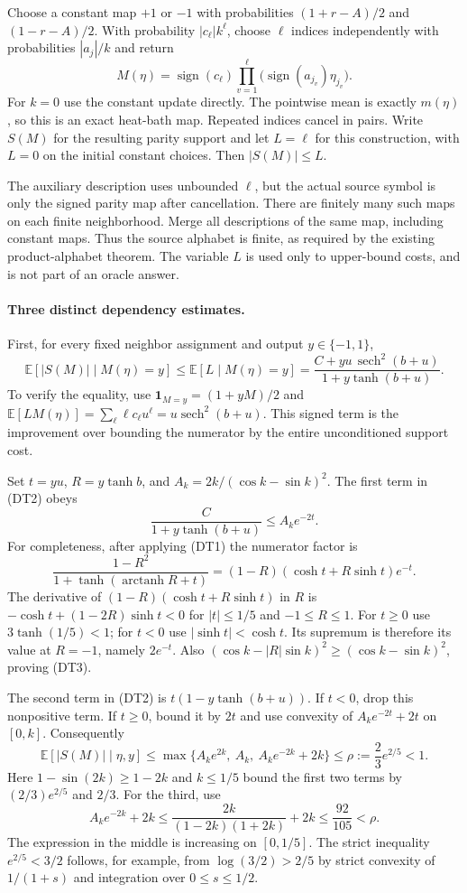 Choose a constant map $+1$ or $-1$ with probabilities
$(1+r-A)/2$ and $(1-r-A)/2$. With probability
$|c_\ell|k^\ell$, choose $\ell$ indices independently with
probabilities $|a_j|/k$ and return
\[
 M(\eta)=\operatorname{sign}(c_\ell)
             \prod_{v=1}^\ell\bigl(\operatorname{sign}(a_{j_v})\eta_{j_v}\bigr).
\]
For $k=0$ use the constant update directly. The pointwise mean is
exactly $m(\eta)$, so this is an exact heat-bath map. Repeated indices
cancel in pairs. Write $S(M)$ for the resulting parity support and
let $L=\ell$ for this construction, with $L=0$ on the initial constant
choices. Then $|S(M)|\le L$.

The auxiliary description uses unbounded $\ell$, but the actual
source symbol is only the signed parity map after cancellation.
There are finitely many such maps on each finite neighborhood.
Merge all descriptions of the same map, including constant maps.
Thus the source alphabet is finite, as required by the existing
product-alphabet theorem. The variable $L$ is used only to upper-bound
costs, and is not part of an oracle answer.

\paragraph{Three distinct dependency estimates.}
First, for every fixed neighbor assignment and output $y\in\{-1,1\}$,
\[
 \mathbb E[|S(M)|\mid M(\eta)=y]
 \le \mathbb E[L\mid M(\eta)=y]
 =\frac{C+y u\,\operatorname{sech}^2(b+u)}{1+y\tanh(b+u)}.
                                                               \tag{DT2}
\]
To verify the equality, use
$\mathbf1_{M=y}=(1+yM)/2$ and
$\mathbb E[LM(\eta)]=\sum_\ell\ell c_\ell u^\ell
=u\operatorname{sech}^2(b+u)$.
This signed term is the improvement over bounding the numerator
by the entire unconditioned support cost.

Set $t=yu$, $R=y\tanh b$, and
$A_k=2k/(\cos k-\sin k)^2$. The first term in (DT2) obeys
\[
 \frac{C}{1+y\tanh(b+u)}\le A_k e^{-2t}.              \tag{DT3}
\]
For completeness, after applying (DT1) the numerator factor is
\[
 \frac{1-R^2}{1+\tanh(\operatorname{arctanh}R+t)}
 =(1-R)(\cosh t+R\sinh t)e^{-t}.
\]
The derivative of $(1-R)(\cosh t+R\sinh t)$ in $R$ is
$-\cosh t+(1-2R)\sinh t<0$ for $|t|\le1/5$ and $-1\le R\le1$.
For $t\ge0$ use $3\tanh(1/5)<1$; for $t<0$ use
$|\sinh t|<\cosh t$. Its supremum is therefore its value at
$R=-1$, namely $2e^{-t}$. Also
$(\cos k-|R|\sin k)^2\ge(\cos k-\sin k)^2$, proving (DT3).

The second term in (DT2) is $t(1-y\tanh(b+u))$. If $t<0$, drop
this nonpositive term. If $t\ge0$, bound it by $2t$ and use convexity
of $A_ke^{-2t}+2t$ on $[0,k]$. Consequently
\[
 \mathbb E[|S(M)|\mid\eta,y]
 \le\max\{A_ke^{2k},\ A_k,\ A_ke^{-2k}+2k\}
 \le \rho:=\frac23 e^{2/5}<1.                       \tag{DT4}
\]
Here $1-\sin(2k)\ge1-2k$ and $k\le1/5$ bound the first two
terms by $(2/3)e^{2/5}$ and $2/3$. For the third, use
\[
 A_ke^{-2k}+2k
 \le\frac{2k}{(1-2k)(1+2k)}+2k
 \le\frac{92}{105}<\rho.
\]
The expression in the middle is increasing on $[0,1/5]$.
The strict inequality $e^{2/5}<3/2$ follows, for example, from
$\log(3/2)>2/5$ by strict convexity of $1/(1+s)$ and integration
over $0\le s\le1/2$.

